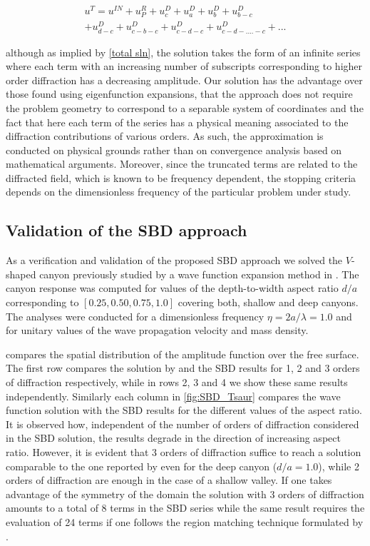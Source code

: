 \documentclass[11pt,letterpaper]{article}
\begin{document}
\begin{multline}
{u^T}=u^{IN}+u^R_P+u^D_c+u^D_a+u^D_b+u^D_{b-c}\\
+u^D_{d-c}+u^D_{c-b-c}+u^D_{c-d-c}+u^D_{c-d-....-c}+... 
\label{total sln}
\end{multline}

although as implied by \cref{total sln}, the solution takes the form of an infinite series where each term with an increasing number of subscripts corresponding to higher order diffraction has a decreasing amplitude. Our solution has the advantage over those found using eigenfunction expansions, that the approach does not require the problem geometry to correspond to a separable system of coordinates and the fact that here each term of the series has a physical meaning associated to the diffraction contributions of various orders. As such, the approximation is conducted on physical grounds rather than on convergence analysis based on mathematical arguments. Moreover, since the truncated terms are related to the diffracted field, which is known to be frequency dependent, the stopping criteria depends on the dimensionless frequency of the particular problem under study.

\subsection*{Validation of the SBD approach}

As a verification and validation of the proposed SBD approach we solved the $V$-shaped canyon previously studied by a wave function expansion method in \cite{tsaur2008analytical}. The canyon response was computed for values of the depth-to-width aspect ratio $d/a$ corresponding to $[0.25, 0.50, 0.75, 1.0]$ covering both, shallow and deep canyons. The analyses were conducted for a dimensionless frequency $\eta=2a/\lambda=1.0$ and for unitary values of the wave propagation velocity and mass density.

 compares the spatial distribution of the amplitude function over the free surface. The first row compares the solution by \cite{tsaur2008analytical} and the SBD results for 1, 2 and 3 orders of diffraction respectively, while in rows 2, 3 and 4 we show these same results independently. Similarly each column in \cref{fig:SBD_Tsaur} compares the wave function solution with the SBD results for the different values of the aspect ratio. It is observed how, independent of the number of orders of diffraction considered in the SBD solution, the results degrade in the direction of increasing aspect ratio. However, it is evident that 3 orders of diffraction suffice to reach  a solution comparable to the one reported by \cite{tsaur2008analytical} even for the deep canyon ($d/a=1.0$), while 2 orders of diffraction are enough in the case of a shallow valley. If one takes advantage of the symmetry of the domain the solution with 3 orders of diffraction amounts to a total of 8 terms in the SBD series while the same result requires the evaluation of 24 terms if one follows the region matching technique formulated by \cite{tsaur2008analytical}.
%
\end{document}
